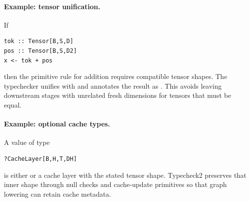 \paragraph{Example: tensor unification.}
If
\begin{verbatim}
tok :: Tensor[B,S,D]
pos :: Tensor[B,S,D2]
x <- tok + pos
\end{verbatim}
then the primitive rule for addition requires compatible tensor shapes.  The
typechecker unifies  with  and annotates the result as
.  This avoids leaving downstream stages with unrelated
fresh dimensions for tensors that must be equal.

\paragraph{Example: optional cache types.}
A value of type
\begin{verbatim}
?CacheLayer[B,H,T,DH]
\end{verbatim}
is either  or a cache layer with the stated tensor shape.  Typecheck2
preserves that inner shape through null checks and cache-update primitives so
that graph lowering can retain cache metadata.
